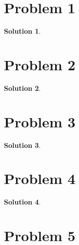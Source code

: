 \documentclass{article}
\theoremstyle{definition}
\newtheorem{solution}{Solution} %
\begin{document}
\section*{Problem 1}

\begin{solution}
\end{solution}

\newpage


\section*{Problem 2}

\begin{solution}
\end{solution}

\newpage


\section*{Problem 3}

\begin{solution}
\end{solution}

\newpage


\section*{Problem 4}

\begin{solution}
\end{solution}

\newpage


\section*{Problem 5}
\end{document}
